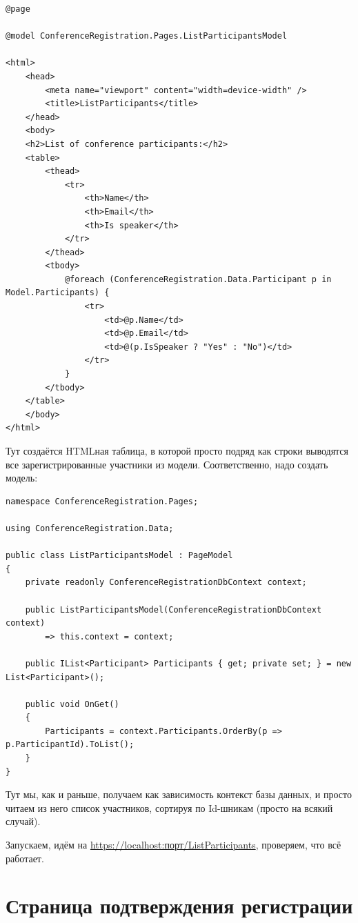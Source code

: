 \documentclass{../../text-style}
\begin{document}
\begin{verbatim}
@page

@model ConferenceRegistration.Pages.ListParticipantsModel

<html>
    <head>
        <meta name="viewport" content="width=device-width" />
        <title>ListParticipants</title>
    </head>
    <body>
    <h2>List of conference participants:</h2>
    <table>
        <thead>
            <tr>
                <th>Name</th>
                <th>Email</th>
                <th>Is speaker</th>
            </tr>
        </thead>
        <tbody>
            @foreach (ConferenceRegistration.Data.Participant p in Model.Participants) {
                <tr>
                    <td>@p.Name</td>
                    <td>@p.Email</td>
                    <td>@(p.IsSpeaker ? "Yes" : "No")</td>
                </tr>
            }
        </tbody>
    </table>
    </body>
</html>
\end{verbatim}

Тут создаётся HTMLная таблица, в которой просто подряд как строки выводятся все зарегистрированные участники из модели. Соответственно, надо создать модель:

\begin{verbatim}
namespace ConferenceRegistration.Pages;

using ConferenceRegistration.Data;

public class ListParticipantsModel : PageModel
{
    private readonly ConferenceRegistrationDbContext context;

    public ListParticipantsModel(ConferenceRegistrationDbContext context)
        => this.context = context;

    public IList<Participant> Participants { get; private set; } = new List<Participant>();

    public void OnGet()
    {
        Participants = context.Participants.OrderBy(p => p.ParticipantId).ToList();
    }
}
\end{verbatim}

Тут мы, как и раньше, получаем как зависимость контекст базы данных, и просто читаем из него список участников, сортируя по Id-шникам (просто на всякий случай).

Запускаем, идём на \url{https://localhost:порт/ListParticipants}, проверяем, что всё работает.

\section{Страница подтверждения регистрации}
\end{document}
